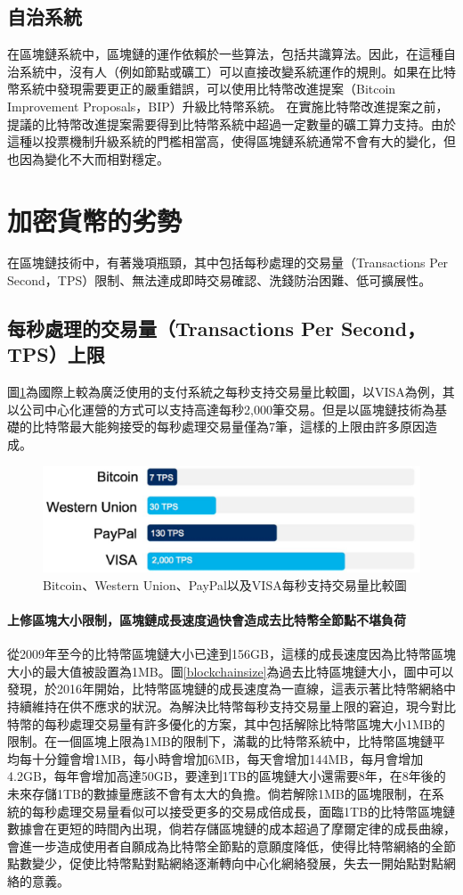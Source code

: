 		\subsection{自治系統}
		在區塊鏈系統中，區塊鏈的運作依賴於一些算法，包括共識算法。因此，在這種自治系統中，沒有人（例如節點或礦工）可以直接改變系統運作的規則。如果在比特幣系統中發現需要更正的嚴重錯誤，可以使用比特幣改進提案（Bitcoin Improvement Proposals，BIP）升級比特幣系統。 在實施比特幣改進提案之前，提議的比特幣改進提案需要得到比特幣系統中超過一定數量的礦工算力支持。由於這種以投票機制升級系統的門檻相當高，使得區塊鏈系統通常不會有大的變化，但也因為變化不大而相對穩定。

	\section{加密貨幣的劣勢}
	在區塊鏈技術中，有著幾項瓶頸，其中包括每秒處理的交易量（Transactions Per Second，TPS）限制、無法達成即時交易確認、洗錢防治困難、低可擴展性。

		\subsection{每秒處理的交易量（Transactions Per Second，TPS）上限}
		圖\ref{TPS}為國際上較為廣泛使用的⽀付系統之每秒⽀持交易量⽐較圖，以VISA為例，其以公司中心化運營的方式可以支持高達每秒2,000筆交易。但是以區塊鏈技術為基礎的比特幣最大能夠接受的每秒處理交易量僅為7筆，這樣的上限由許多原因造成。

			\begin{figure}[h]
				\centering
				\includegraphics[width = .7\textwidth]{TPS.png}
				\caption{Bitcoin、Western Union、PayPal以及VISA每秒支持交易量比較圖\supercite{TPS}}\label{TPS}
			\end{figure}

			\paragraph{上修區塊大小限制，區塊鏈成長速度過快會造成去比特幣全節點不堪負荷}
			從2009年至今的比特幣區塊鏈大小已達到156GB，這樣的成長速度因為比特幣區塊大小的最大值被設置為1MB。圖\ref{blockchainsize}為過去比特區塊鏈大小，圖中可以發現，於2016年開始，比特幣區塊鏈的成長速度為一直線，這表示著比特幣網絡中持續維持在供不應求的狀況。為解決比特幣每秒⽀持交易量上限的窘迫，現今對⽐特幣的每秒處理交易量有許多優化的⽅案，其中包括解除比特幣區塊大小1MB的限制。在一個區塊上限為1MB的限制下，滿載的比特幣系統中，比特幣區塊鏈平均每十分鐘會增1MB，每小時會增加6MB，每天會增加144MB，每月會增加4.2GB，每年會增加高達50GB，要達到1TB的區塊鏈大小還需要8年，在8年後的未來存儲1TB的數據量應該不會有太大的負擔。倘若解除1MB的區塊限制，在系統的每秒處理交易量看似可以接受更多的交易成倍成長，面臨1TB的比特幣區塊鏈數據會在更短的時間內出現，倘若存儲區塊鏈的成本超過了摩爾定律的成長曲線，會進一步造成使用者自願成為比特幣全節點的意願度降低，使得比特幣網絡的全節點數變少，促使比特幣點對點網絡逐漸轉向中心化網絡發展，失去一開始點對點網絡的意義。

